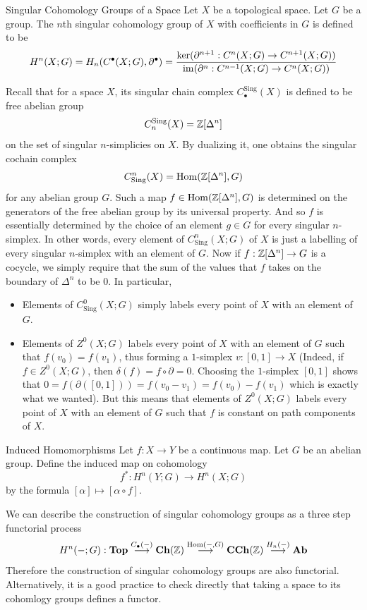 \documentclass[a4paper]{article}
\begin{document}
\begin{defn}{Singular Cohomology Groups of a Space}{} Let $X$ be a topological space. Let $G$ be a group. The $n$th singular cohomology group of $X$ with coefficients in $G$ is defined to be $$H^n(X;G)=H_n(C^\bullet(X;G),\partial^\bullet)=\frac{\ker(\partial^{n+1}:C^n(X;G)\to C^{n+1}(X;G))}{\operatorname{im}(\partial^n:C^{n-1}(X;G)\to C^n(X;G))}$$
\end{defn}

Recall that for a space $X$, its singular chain complex $C_\bullet^\text{Sing}(X)$ is defined to be free abelian group $$C_n^\text{Sing}(X)=\mathbb{Z}[\Delta^n]$$ on the set of singular $n$-simplicies on $X$. By dualizing it, one obtains the singular cochain complex $$C_\text{Sing}^n(X)=\operatorname{Hom}(\mathbb{Z}[\Delta^n],G)$$ for any abelian group $G$. Such a map $f\in\operatorname{Hom}(\mathbb{Z}[\Delta^n],G)$ is determined on the generators of the free abelian group by its universal property. And so $f$ is essentially determined by the choice of an element $g\in G$ for every singular $n$-simplex. In other words, every element of $C_\text{Sing}^n(X;G)$ of $X$ is just a labelling of every singular $n$-simplex with an element of $G$. Now if $f:\mathbb{Z}[\Delta^n]\to G$ is a cocycle, we simply require that the sum of the values that $f$ takes on the boundary of $\Delta^n$ to be $0$. In particular, 
\begin{itemize}
\item Elements of $C_\text{Sing}^0(X;G)$ simply labels every point of $X$ with an element of $G$. 
\item Elements of $Z^0(X;G)$ labels every point of $X$ with an element of $G$ such that $f(v_0)=f(v_1)$, thus forming a $1$-simplex $v:[0,1]\to X$ (Indeed, if $f\in Z^0(X;G)$, then $\delta(f)=f\circ\partial=0$. Choosing the $1$-simplex $[0,1]$ shows that $0=f(\partial([0,1]))=f(v_0-v_1)=f(v_0)-f(v_1)$ which is exactly what we wanted). But this means that elements of $Z^0(X;G)$ labels every point of $X$ with an element of $G$ such that $f$ is constant on path components of $X$. 
\end{itemize}

\begin{defn}{Induced Homomorphisms}{} Let $f:X\to Y$ be a continuous map. Let $G$ be an abelian group. Define the induced map on cohomology $$f^\ast:H^n(Y;G)\to H^n(X;G)$$ by the formula $[\alpha]\mapsto[\alpha\circ f]$. 
\end{defn}

We can describe the construction of singular cohomology groups as a three step functorial process $$H^n(-;G):\bold{Top}\overset{C_\bullet(-)}{\longrightarrow}\bold{Ch}(\mathbb{Z})\overset{\operatorname{Hom}(-,G)}{\longrightarrow}\bold{CCh}(\mathbb{Z})\overset{H_n(-)}{\longrightarrow}\bold{Ab}$$ Therefore the construction of singular cohomology groups are also functorial. Alternatively, it is a good practice to check directly that taking a space to its cohomlogy groups defines a functor. 
\end{document}
